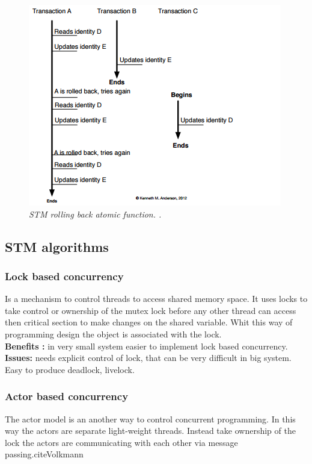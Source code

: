 \documentclass[12pt]{article}
\begin{document}
\begin{figure}[h!]
\centering
\includegraphics[scale=0.8]{Pictures/STMRollback.png}
\caption{\textit{\color{gray}STM rolling back atomic function. \cite{Kenneth}.}}
\end{figure}

\subsection{STM algorithms}
\subsubsection{Lock based concurrency}
Is a mechanism to control threads to access shared memory space. It uses locks to take control or ownership of the mutex lock before any other thread can access then critical section to make changes on the shared variable. Whit this way of programming design the object is associated with the lock.\cite{Volkmann}\\

{\setlength{\parindent}{0cm}
\textbf{Benefits :} in very small system easier to implement lock based concurrency.\\

\textbf{Issues:} needs explicit control of lock, that can be very difficult in big system. Easy to produce deadlock, livelock.}\\
\subsubsection{Actor based concurrency}
The actor model is an another way to control concurrent programming. In this way the actors are  separate light-weight threads. Instead take ownership of the lock the actors are communicating with each other via message passing.cite{Volkmann}\\
\end{document}
